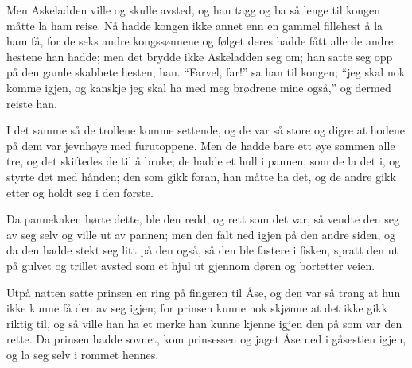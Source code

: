 \documentclass[a4paper]{report}
\begin{document}
\begin{minipage}{0.5\textwidth}
Men Askeladden ville og skulle avsted, og han tagg og ba så lenge til kongen måtte la ham reise. Nå hadde kongen ikke annet enn en gammel fillehest å la ham få, for de seks andre kongssønnene og følget deres hadde fått alle de andre hestene han hadde; men det brydde ikke Askeladden seg om; han satte seg opp på den gamle skabbete hesten, han. ``Farvel, far!'' sa han til kongen; ``jeg skal nok komme igjen, og kanskje jeg skal ha med meg brødrene mine også,'' og dermed reiste han.

I det samme så de trollene komme settende, og de var så store og digre at hodene på dem var jevnhøye med furutoppene. Men de hadde bare ett øye sammen alle tre, og det skiftedes de til å bruke; de hadde et hull i pannen, som de la det i, og styrte det med hånden; den som gikk foran, han måtte ha det, og de andre gikk etter og holdt seg i den første.

Da pannekaken hørte dette, ble den redd, og rett som det var, så vendte den seg av seg selv og ville ut av pannen; men den falt ned igjen på den andre siden, og da den hadde stekt seg litt på den også, så den ble fastere i fisken, spratt den ut på gulvet og trillet avsted som et hjul ut gjennom døren og bortetter veien.

Utpå natten satte prinsen en ring på fingeren til Åse, og den var så trang at hun ikke kunne få den av seg igjen; for prinsen kunne nok skjønne at det ikke gikk riktig til, og så ville han ha et merke han kunne kjenne igjen den på som var den rette. Da prinsen hadde sovnet, kom prinsessen og jaget Åse ned i gåsestien igjen, og la seg selv i rommet hennes.

\end{minipage}
\end{document}

